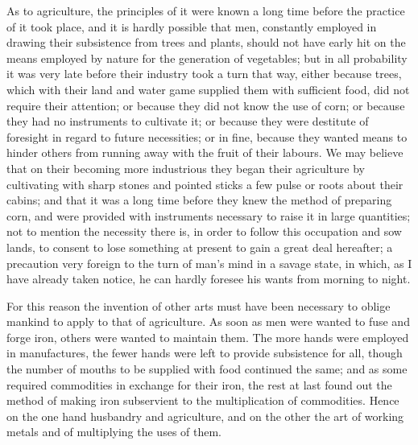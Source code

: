 \documentclass[11pt,twocolumn]{ltugboat}
\begin{document}
As to agriculture, the principles of it were known a long time before
the practice of it took place, and it is hardly possible that men,
constantly employed in drawing their subsistence from trees and
plants, should not have early hit on the means employed by nature for
the generation of vegetables; but in all probability it was very late
before their industry took a turn that way, either because trees,
which with their land and water game supplied them with sufficient
food, did not require their attention; or because they did not know
the use of corn; or because they had no instruments to cultivate it;
or because they were destitute of foresight in regard to future
necessities; or in fine, because they wanted means to hinder others
from running away with the fruit of their labours. We may believe that
on their becoming more industrious they began their agriculture by
cultivating with sharp stones and pointed sticks a few pulse or roots
about their cabins; and that it was a long time before they knew the
method of preparing corn, and were provided with instruments necessary
to raise it in large quantities; not to mention the necessity there
is, in order to follow this occupation and sow lands, to consent to
lose something at present to gain a great deal hereafter; a precaution
very foreign to the turn of man's mind in a savage state, in which, as
I have already taken notice, he can hardly foresee his wants from
morning to night.

For this reason the invention of other arts must have been necessary
to oblige mankind to apply to that of agriculture. As soon as men
were wanted to fuse and forge iron, others were wanted to maintain
them. The more hands were employed in manufactures, the fewer hands
were left to provide subsistence for all, though the number of mouths
to be supplied with food continued the same; and as some required
commodities in exchange for their iron, the rest at last found out the
method of making iron subservient to the multiplication of
commodities. Hence on the one hand husbandry and agriculture, and on
the other the art of working metals and of multiplying the uses of
them.
\end{document}
